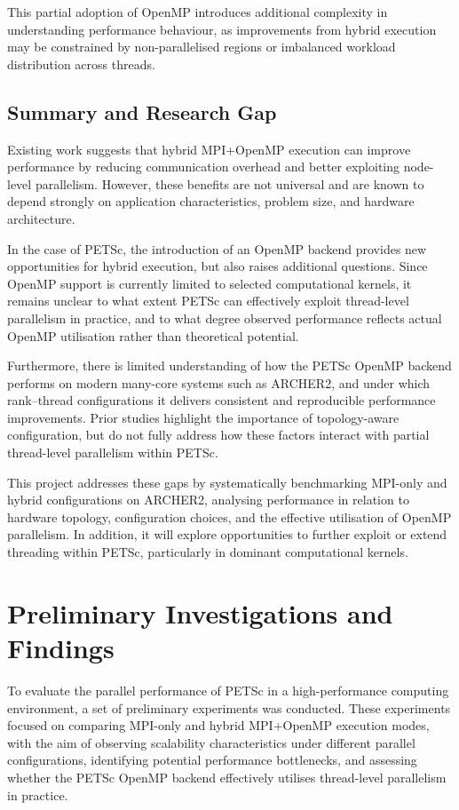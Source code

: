 \documentclass{article}
\begin{document}
This partial adoption of OpenMP introduces additional complexity in understanding performance behaviour, as improvements from hybrid execution may be constrained by non-parallelised regions or imbalanced workload distribution across threads.

\subsection{Summary and Research Gap}

Existing work suggests that hybrid MPI+OpenMP execution can improve performance by reducing communication overhead and better exploiting node-level parallelism. 
However, these benefits are not universal and are known to depend strongly on application characteristics, problem size, and hardware architecture.

In the case of PETSc, the introduction of an OpenMP backend provides new opportunities for hybrid execution, but also raises additional questions. 
Since OpenMP support is currently limited to selected computational kernels, it remains unclear to what extent PETSc can effectively exploit thread-level parallelism in practice, and to what degree observed performance reflects actual OpenMP utilisation rather than theoretical potential.

Furthermore, there is limited understanding of how the PETSc OpenMP backend performs on modern many-core systems such as ARCHER2, and under which rank--thread configurations it delivers consistent and reproducible performance improvements. 
Prior studies highlight the importance of topology-aware configuration, but do not fully address how these factors interact with partial thread-level parallelism within PETSc.

This project addresses these gaps by systematically benchmarking MPI-only and hybrid configurations on ARCHER2, analysing performance in relation to hardware topology, configuration choices, and the effective utilisation of OpenMP parallelism. 
In addition, it will explore opportunities to further exploit or extend threading within PETSc, particularly in dominant computational kernels.
\section{Preliminary Investigations and Findings}

To evaluate the parallel performance of PETSc in a high-performance computing environment, a set of preliminary experiments was conducted. 
These experiments focused on comparing MPI-only and hybrid MPI+OpenMP execution modes, 
with the aim of observing scalability characteristics under different parallel configurations, identifying potential performance bottlenecks, and assessing whether the PETSc OpenMP backend effectively utilises thread-level parallelism in practice.
\end{document}
